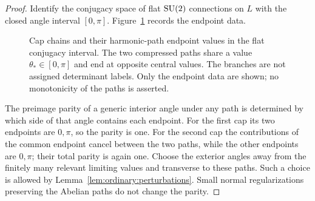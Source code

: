 \begin{proof}
Identify the conjugacy space of flat $\operatorname{SU}(2)$
connections on $L$ with the closed angle interval
$[0,\pi]$.
Figure~\ref{fig:ordinary:cap-endpoints} records the endpoint data.
\begin{figure}[htbp]
\centering
{}
\caption{Cap chains and their harmonic-path endpoint values in the
flat conjugacy interval.  The two compressed paths share a value
$\theta_*\in[0,\pi]$ and end at opposite central values.  The branches
are not assigned determinant labels.  Only the endpoint data are shown;
no monotonicity of the paths is asserted.}
\label{fig:ordinary:cap-endpoints}
\end{figure}

The preimage parity of a generic interior
angle under any path is determined by which side of
that angle contains each endpoint.  For the first
cap its two endpoints are $0,\pi$, so the parity is
one.  For the second cap the contributions of the
common endpoint cancel between the two paths, while
the other endpoints are $0,\pi$; their total parity
is again one.  Choose the exterior angles away from
the finitely many relevant limiting values and
transverse to these paths.  Such a choice is allowed
by Lemma~\ref{lem:ordinary:perturbations}.  Small
normal regularizations preserving the Abelian paths
do not change the parity.
\end{proof}

